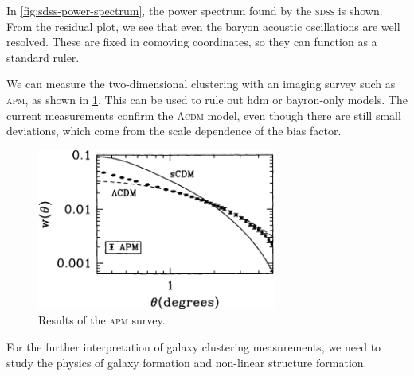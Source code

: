 In \cref{fig:sdss-power-spectrum}, the power spectrum found by the \textsc{sdss} is shown.
From the residual plot, we see that even the baryon acoustic oscillations are well resolved.
These are fixed in comoving coordinates, so they can function as a standard ruler.

We can measure the two-dimensional clustering with an imaging survey such as \textsc{apm}, as shown in \cref{fig:apm}.
This can be used to rule out \ac{hdm} or bayron-only models.
The current measurements confirm the \textsc{Λcdm} model, even though there are still small deviations, which come from the scale dependence of the bias factor.
\begin{figure}
	\centering
	\includegraphics[width=0.7\textwidth]{img/ch-03/apm.pdf}
	\caption{Results of the \textsc{apm} survey.}
	\label{fig:apm}
\end{figure}

For the further interpretation of galaxy clustering measurements, we need to study the physics of galaxy formation and non-linear structure formation.

